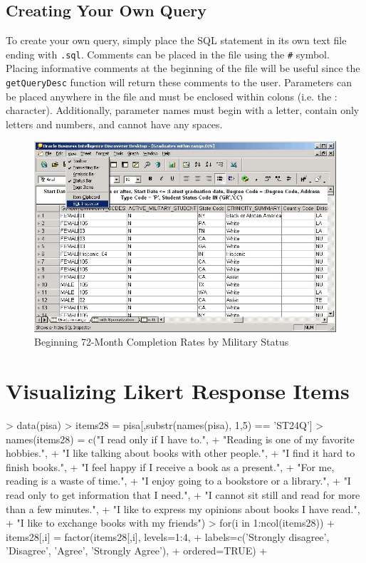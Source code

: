 \documentclass[letterpaper,11pt]{article}
\begin{document}
\subsection{Creating Your Own Query}

To create your own query, simply place the SQL statement in its own text file ending with \texttt{.sql}. Comments can be placed in the file using the \texttt{\#} symbol. Placing informative comments at the beginning of the file will be useful since the \texttt{getQueryDesc} function will return these comments to the user. Parameters can be placed anywhere in the file and must be enclosed within colons (i.e. the : character). Additionally, parameter names must begin with a letter, contain only letters and numbers, and cannot have any spaces.

\begin{figure}[h]
\begin{center}
\includegraphics{DiscovererMenu}
\caption{Beginning 72-Month Completion Rates by Military Status}
\label{fig:discoverer}
\end{center}
\end{figure}



\section{Visualizing Likert Response Items}

\begin{Schunk}
\begin{Sinput}
> data(pisa)
> items28 = pisa[,substr(names(pisa), 1,5) == 'ST24Q']
> names(items28) = c("I read only if I have to.",
+    "Reading is one of my favorite hobbies.",
+    "I like talking about books with other people.",
+    "I find it hard to finish books.",
+    "I feel happy if I receive a book as a present.",
+    "For me, reading is a waste of time.",
+    "I enjoy going to a bookstore or a library.",
+    "I read only to get information that I need.",
+    "I cannot sit still and read for more than a few minutes.",
+    "I like to express my opinions about books I have read.",
+    "I like to exchange books with my friends")
> for(i in 1:ncol(items28)) {
+ 	items28[,i] = factor(items28[,i], levels=1:4, 
+ 		labels=c('Strongly disagree', 'Disagree', 'Agree', 'Strongly Agree'),
+ 		ordered=TRUE)
+ }
\end{Sinput}
\end{Schunk}
\end{document}
